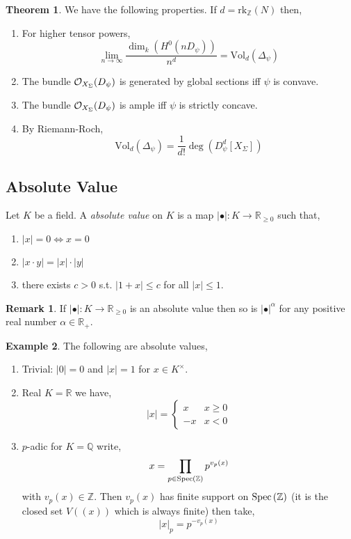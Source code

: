 \documentclass[12pt]{extarticle}
\newcommand{\Z}{\mathbb{Z}}
\newcommand{\R}{\mathbb{R}}
\theoremstyle{definition}
\newtheorem{theorem}{Theorem}[section]
\newtheorem{example}[theorem]{Example}
\newtheorem{remark}{Remark}
\newenvironment{definition}[1][Definition:]{\begin{trivlist}
\item[\hskip \labelsep {\bfseries #1}]}{\end{trivlist}}
\newcommand{\Vol}[2]{\mathrm{Vol}_{#1}\left( #2 \right)}
\begin{document}
\begin{theorem}
We have the following properties. If $d = \mathrm{rk}_\Z(N)$ then,
\begin{enumerate}
\item For higher tensor powers,
\[ \lim_{n \to \infty} \frac{\dim_k (H^0(n D_\psi))}{n^d} = \Vol{d}{\Delta_\psi} \]
\item The bundle $\mathcal{O}_{X_\Sigma}(D_\psi)$ is generated by global sections iff $\psi$ is convave.
\item The bundle $\mathcal{O}_{X_\Sigma}(D_\psi)$ is ample iff $\psi$ is strictly concave.
\item By Riemann-Roch,
\[ \Vol{d}{\Delta_\psi} = \frac{1}{d!} \deg{\left( D_\psi^d [X_\Sigma] \right)} \]
\end{enumerate}
\end{theorem}

\subsection{Absolute Value}

\begin{definition}
Let $K$ be a field. A \textit{absolute value} on $K$ is a map $| \bullet | : K \to \R_{\ge 0}$ such that,
\begin{enumerate}
\item $|x| = 0 \iff x = 0$
\item $|x \cdot y| = |x| \cdot |y|$
\item there exists $c > 0$ s.t. $|1 + x| \le c$ for all $|x| \le 1$.
\end{enumerate}
\end{definition}

\begin{remark}
If $| \bullet | : K \to \R_{\ge 0}$ is an absolute value then so is $| \bullet |^\alpha$ for any positive real number $\alpha \in \R_{+}$. 
\end{remark}

\begin{example}
The following are absolute values,
\begin{enumerate}
\item Trivial: $|0| = 0$ and $|x| = 1$ for $x \in K^\times$.
\item Real $K = \R$ we have,
\[ |x| = \begin{cases}
x & x \ge 0
\\
-x & x < 0
\end{cases} \]
\item $p$-adic for $K = \mathbb{Q}$ write,
\[ x = \prod_{p \in \Spec{\Z}} p^{v_p(x)} \]
with $v_p(x) \in \Z$. Then $v_p(x)$ has finite support on $\Spec{\Z}$ (it is the closed set $V((x))$ which is always finite) then take,
\[ |x|_p = p^{-v_p(x)} \] 
\end{enumerate}
\end{example}
\end{document}
